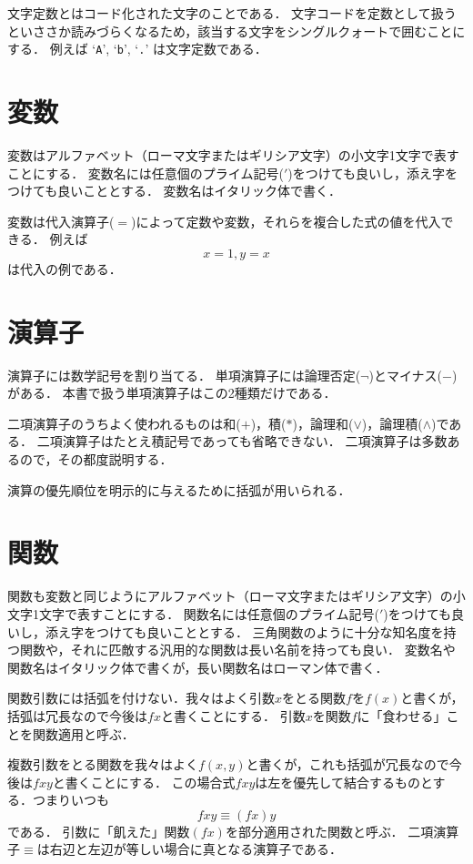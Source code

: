 \documentclass[twocolumn]{jsbook}
\newcommand{\charlit}[1]{\texttt{#1}}
\begin{document}
文字定数とはコード化された文字のことである．
文字コードを定数として扱うといささか読みづらくなるため，該当する文字をシングルクォートで囲むことにする．
例えば `\charlit{A}', `\charlit{b}', `\charlit{.}' は文字定数である．

\section{変数}

変数はアルファベット（ローマ文字またはギリシア文字）の小文字1文字で表すことにする．
変数名には任意個のプライム記号($'$)をつけても良いし，添え字をつけても良いこととする．
変数名はイタリック体で書く．

変数は代入演算子($=$)によって定数や変数，それらを複合した式の値を代入できる．
例えば $$x=1, y=x$$ は代入の例である．

\section{演算子}

演算子には数学記号を割り当てる．
単項演算子には論理否定($\neg$)とマイナス($-$)がある．
本書で扱う単項演算子はこの2種類だけである．

二項演算子のうちよく使われるものは和($+$)，積($\ast$)，論理和($\vee$)，論理積($\wedge$)である．
二項演算子はたとえ積記号であっても省略できない．
二項演算子は多数あるので，その都度説明する．

演算の優先順位を明示的に与えるために括弧が用いられる．

\section{関数}

関数も変数と同じようにアルファベット（ローマ文字またはギリシア文字）の小文字1文字で表すことにする．
関数名には任意個のプライム記号($'$)をつけても良いし，添え字をつけても良いこととする．
三角関数のように十分な知名度を持つ関数や，それに匹敵する汎用的な関数は長い名前を持っても良い．
変数名や関数名はイタリック体で書くが，長い関数名はローマン体で書く．

関数引数には括弧を付けない．我々はよく引数$x$をとる関数$f$を$f(x)$と書くが，括弧は冗長なので今後は$fx$と書くことにする．
引数$x$を関数$f$に「食わせる」ことを関数適用と呼ぶ．

複数引数をとる関数を我々はよく$f(x,y)$と書くが，これも括弧が冗長なので今後は$fxy$と書くことにする．
この場合式$fxy$は左を優先して結合するものとする．つまりいつも$$fxy\equiv (fx)y$$である．
引数に「飢えた」関数$(fx)$を部分適用された関数と呼ぶ．
二項演算子$\equiv$は右辺と左辺が等しい場合に真となる演算子である．
\end{document}

